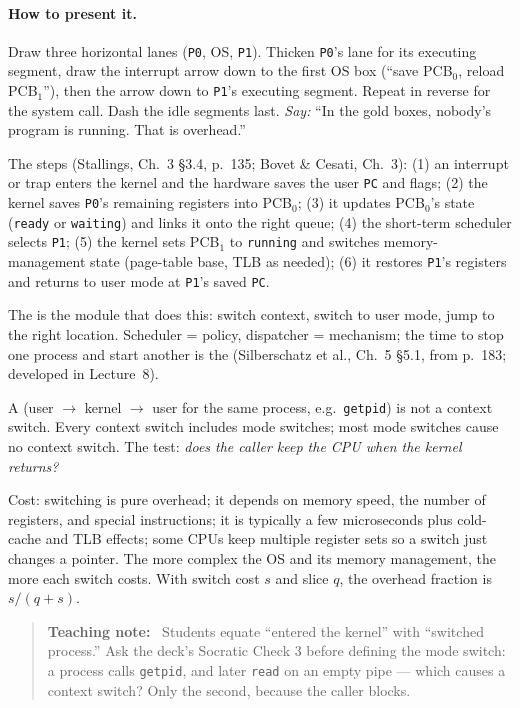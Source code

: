 \documentclass[11pt]{article}
\newenvironment{teachingaside}{\begin{quote}\small\color{primary-gold}\textbf{Teaching note:}\ }{\end{quote}}
\begin{document}
\paragraph{How to present it.} Draw three horizontal lanes (\texttt{P0}, OS, \texttt{P1}). Thicken \texttt{P0}'s lane for its executing segment, draw the interrupt arrow down to the first OS box (``save PCB$_0$, reload PCB$_1$''), then the arrow down to \texttt{P1}'s executing segment. Repeat in reverse for the system call. Dash the idle segments last. \emph{Say:} ``In the gold boxes, nobody's program is running. That is overhead.''

The steps (Stallings, Ch.~3 \S3.4, p.~135; Bovet \& Cesati, Ch.~3): (1) an interrupt or trap enters the kernel and the hardware saves the user \texttt{PC} and flags; (2) the kernel saves \texttt{P0}'s remaining registers into PCB$_0$; (3) it updates PCB$_0$'s state (\texttt{ready} or \texttt{waiting}) and links it onto the right queue; (4) the short-term scheduler selects \texttt{P1}; (5) the kernel sets PCB$_1$ to \texttt{running} and switches memory-management state (page-table base, TLB as needed); (6) it restores \texttt{P1}'s registers and returns to user mode at \texttt{P1}'s saved \texttt{PC}.

The  is the module that does this: switch context, switch to user mode, jump to the right location. Scheduler = policy, dispatcher = mechanism; the time to stop one process and start another is the  (Silberschatz et al., Ch.~5 \S5.1, from p.~183; developed in Lecture~8).

A  (user $\to$ kernel $\to$ user for the same process, e.g.\ \texttt{getpid}) is not a context switch. Every context switch includes mode switches; most mode switches cause no context switch. The test: \emph{does the caller keep the CPU when the kernel returns?}

Cost: switching is pure overhead; it depends on memory speed, the number of registers, and special instructions; it is typically a few microseconds plus cold-cache and TLB effects; some CPUs keep multiple register sets so a switch just changes a pointer. The more complex the OS and its memory management, the more each switch costs. With switch cost $s$ and slice $q$, the overhead fraction is $s/(q+s)$.

\begin{teachingaside}
Students equate ``entered the kernel'' with ``switched process.'' Ask the deck's Socratic Check 3 before defining the mode switch: a process calls \texttt{getpid}, and later \texttt{read} on an empty pipe --- which causes a context switch? Only the second, because the caller blocks.
\end{teachingaside}
\end{document}
